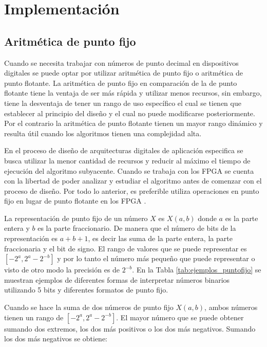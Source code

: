 \chapter{Implementación}

    \section{Aritmética de punto fijo}
        
        Cuando se necesita trabajar con números de punto decimal en dispositivos digitales se puede optar por utilizar aritmética de punto fijo o aritmética de punto flotante. La aritmética de punto fijo en comparación de la de punto flotante tiene la ventaja de ser más rápida y utilizar menos recursos, sin embargo, tiene la desventaja de tener un rango de uso específico el cual se tienen que establecer al principio del diseño y el cual no puede modificarse posteriormente. Por el contrario la aritmética de punto flotante tienen un mayor rango dinámico y resulta útil cuando los algoritmos tienen una complejidad alta. 

        En el proceso de diseño de arquitecturas digitales de aplicación especifica se busca utilizar la menor cantidad de recursos y reducir al máximo el tiempo de ejecución del algoritmo subyacente. Cuando se trabaja con los FPGA se cuenta con la libertad de poder analizar y estudiar el algoritmo antes de comenzar con el proceso de diseño. Por todo lo anterior, es preferible utiliza operaciones en punto fijo en lugar de punto flotante en los FPGA \cite{TleloCuautle2016}.

        La representación de punto fijo de un número $X$ es $X(a,b)$ donde $a$ es la parte entera y $b$ es la parte fraccionario. De manera que el número de bits de la representación es $a+b+1$, es decir las suma de la parte entera, la parte fraccionaria y el bit de signo. El rango de valores que se puede representar es $[-2^{a}, 2^{a} - 2^{-b}]$ y por lo tanto el número más pequeño que puede representar o visto de otro modo la precisión es de $2^{-b}$. En la Tabla \ref{tab:ejemplos_puntofijo} se muestran ejemplos de diferentes formas de interpretar números binarios  utilizando 5 bits y diferentes formatos de punto fijo.
        
        Cuando se hace la suma de dos números de punto fijo $X(a,b)$, ambos números tienen un rango de $[-2^{a}, 2^{a} - 2^{-b}]$. El mayor número que se puede obtener sumando dos extremos, los dos más positivos o los dos más negativos. Sumando los dos más negativos se obtiene:


